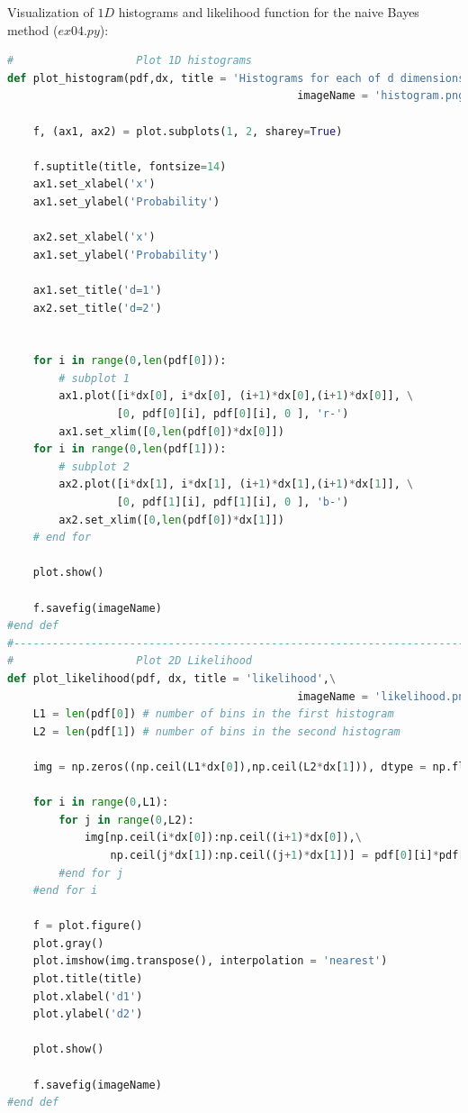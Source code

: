 \documentclass{article}
\begin{document}
Visualization of $1D$ histograms and likelihood function for the naive Bayes method ($ex04.py$):
\begin{lstlisting}[language=Python]
#                   Plot 1D histograms
def plot_histogram(pdf,dx, title = 'Histograms for each of d dimensions',\
                                             imageName = 'histogram.png'):
    
    f, (ax1, ax2) = plot.subplots(1, 2, sharey=True)
    
    f.suptitle(title, fontsize=14)
    ax1.set_xlabel('x')
    ax1.set_ylabel('Probability') 
    
    ax2.set_xlabel('x')
    ax1.set_ylabel('Probability') 
    
    ax1.set_title('d=1')
    ax2.set_title('d=2')
    
    
    for i in range(0,len(pdf[0])):
        # subplot 1
        ax1.plot([i*dx[0], i*dx[0], (i+1)*dx[0],(i+1)*dx[0]], \
                 [0, pdf[0][i], pdf[0][i], 0 ], 'r-')
        ax1.set_xlim([0,len(pdf[0])*dx[0]])                 
    for i in range(0,len(pdf[1])):        
        # subplot 2
        ax2.plot([i*dx[1], i*dx[1], (i+1)*dx[1],(i+1)*dx[1]], \
                 [0, pdf[1][i], pdf[1][i], 0 ], 'b-')
        ax2.set_xlim([0,len(pdf[0])*dx[1]])
    # end for

    plot.show()
    
    f.savefig(imageName)    
#end def      
#-----------------------------------------------------------------------------
#                   Plot 2D Likelihood
def plot_likelihood(pdf, dx, title = 'likelihood',\
                                             imageName = 'likelihood.png'):
    L1 = len(pdf[0]) # number of bins in the first histogram
    L2 = len(pdf[1]) # number of bins in the second histogram    
    
    img = np.zeros((np.ceil(L1*dx[0]),np.ceil(L2*dx[1])), dtype = np.float64)

    for i in range(0,L1):
        for j in range(0,L2):
            img[np.ceil(i*dx[0]):np.ceil((i+1)*dx[0]),\
                np.ceil(j*dx[1]):np.ceil((j+1)*dx[1])] = pdf[0][i]*pdf[1][j]
        #end for j    
    #end for i
        
    f = plot.figure() 
    plot.gray()
    plot.imshow(img.transpose(), interpolation = 'nearest')       
    plot.title(title)
    plot.xlabel('d1')
    plot.ylabel('d2')    

    plot.show()
    
    f.savefig(imageName)    
#end def      
\end{lstlisting}    
\end{document}
